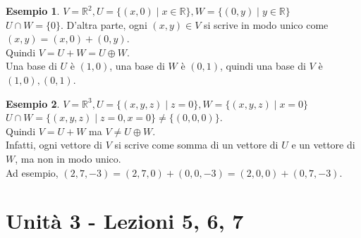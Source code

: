 \documentclass[a4paper]{article}
\theoremstyle{definition}
\newtheorem*{es}{Esempio}
\begin{document}
\begin{es}
	$V = \mathbb{R}^2, U = \{(x, 0) \mid x \in \mathbb{R}\}, W = \{(0, y) \mid y \in \mathbb{R}\}$ \\
	$U \cap W = \{0\}$. D'altra parte, ogni $(x, y) \in V$ si scrive in modo unico come $(x, y) = (x, 0) + (0, y)$. \\
	Quindi $V = U + W = U \oplus W$. \\
	Una base di $U$ è $(1, 0)$, una base di $W$ è $(0, 1)$, quindi una base di $V$ è $(1, 0), (0, 1)$.
\end{es}

\begin{es}
	$V = \mathbb{R}^3, U = \{(x, y, z) \mid z = 0\}, W = \{(x, y, z) \mid x = 0\}$ \\
	$U \cap W = \{(x, y, z) \mid z = 0, x = 0\} \ne \{(0, 0, 0)\}$. \\
	Quindi $V = U + W$ ma $V \ne U \oplus W$. \\
	Infatti, ogni vettore di $V$ si scrive come somma di un vettore di $U$ e un vettore di $W$, ma non in modo unico. \\
	Ad esempio, $(2, 7, -3) = (2, 7, 0) + (0, 0, -3) = (2, 0, 0) + (0, 7, -3)$.
\end{es}

\section{Unità 3 - Lezioni 5, 6, 7}
\end{document}
